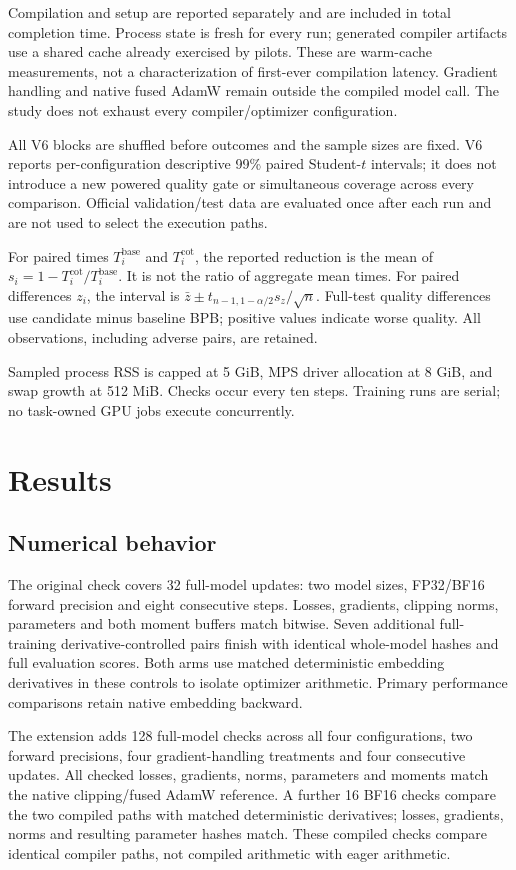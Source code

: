 \documentclass[11pt]{article}
\begin{document}
Compilation and setup are reported separately and are included in total
completion time. Process state is fresh for every run; generated compiler
artifacts use a shared cache already exercised by pilots. These are warm-cache
measurements, not a characterization of first-ever compilation latency.
Gradient handling and native fused AdamW remain outside the compiled model
call. The study does not exhaust every compiler/optimizer configuration.

All V6 blocks are shuffled before outcomes and the sample sizes are fixed.
V6 reports per-configuration descriptive 99\% paired Student-$t$ intervals;
it does not introduce a new powered quality gate or simultaneous coverage
across every comparison. Official validation/test data are evaluated once after
each run and are not used to select the execution paths.

For paired times $T_i^{\mathrm{base}}$ and $T_i^{\mathrm{cot}}$, the reported
reduction is the mean of $s_i=1-T_i^{\mathrm{cot}}/T_i^{\mathrm{base}}$.
It is not the ratio of aggregate mean times. For paired differences $z_i$, the
interval is $\bar z\pm t_{n-1,1-\alpha/2}s_z/\sqrt n$. Full-test quality
differences use candidate minus baseline BPB; positive values indicate worse
quality. All observations, including adverse pairs, are retained.

Sampled process RSS is capped at 5 GiB, MPS driver allocation at 8 GiB, and
swap growth at 512 MiB. Checks occur every ten steps. Training runs are serial;
no task-owned GPU jobs execute concurrently.

\section{Results}
\subsection{Numerical behavior}
The original check covers 32 full-model updates: two model sizes, FP32/BF16
forward precision and eight consecutive steps. Losses, gradients, clipping
norms, parameters and both moment buffers match bitwise. Seven additional
full-training derivative-controlled pairs finish with identical whole-model
hashes and full evaluation scores. Both arms use matched deterministic
embedding derivatives in these controls to isolate optimizer arithmetic.
Primary performance comparisons retain native embedding backward.

The extension adds 128 full-model checks across all four configurations,
two forward precisions, four gradient-handling treatments and four consecutive
updates. All checked losses, gradients, norms, parameters and moments match
the native clipping/fused AdamW reference. A further 16 BF16 checks compare
the two compiled paths with matched deterministic derivatives; losses,
gradients, norms and resulting parameter hashes match. These compiled checks
compare identical compiler paths, not compiled arithmetic with eager arithmetic.
\end{document}
